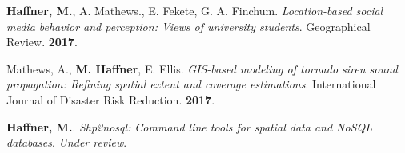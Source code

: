




\begin{cventries}
   \cventry
      {}
      {}
      {}
      {}
      {
        \begin{cvitems}
          \vspace{-4mm}
        \item {\textbf{Haffner, M.}, A. Mathews., E. Fekete, G. A. Finchum.
            \textit{Location-based social media behavior and perception: Views
              of university students}. Geographical Review. \textbf{2017}.} \\
          \vspace{-2mm}
        \end{cvitems}
    }
   \cventry
      {}
      {}
      {}
      {}
      {
        \begin{cvitems}
          \vspace{-4mm}
        \item
          {Mathews, A., \textbf{M. Haffner}, E. Ellis.
            \textit{GIS-based modeling of tornado siren sound propagation:
              Refining spatial extent and coverage estimations}. International
            Journal of Disaster Risk Reduction. \textbf{2017}.} \\
          \vspace{-2mm}
        \end{cvitems}
    }
\end{cventries}



\begin{cventries}
   \cventry
      {}
      {}
      {}
      {}
      {
        \begin{cvitems}
          \vspace{-4mm}
        \item {\textbf{Haffner, M.}.
            \textit{Shp2nosql: Command line tools for spatial data and NoSQL
              databases}. \textit{Under review}.} \\
          \vspace{-2mm}
        \end{cvitems}
    }
\end{cventries}

